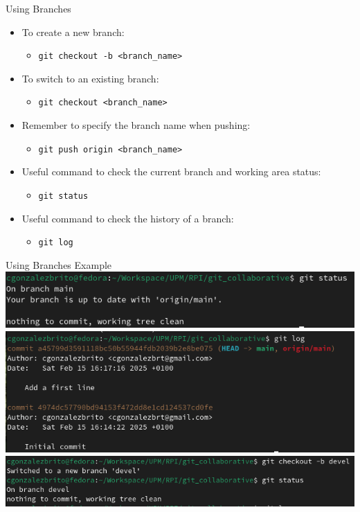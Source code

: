 \begin{frame}{Using Branches}
  \begin{itemize}
    \item To create a new branch:
      \begin{itemize}
        \item \texttt{git checkout -b <branch\_name>}
      \end{itemize}
    \item To switch to an existing branch:
      \begin{itemize}
        \item \texttt{git checkout <branch\_name>}
      \end{itemize}
    \item Remember to specify the branch name when pushing:
      \begin{itemize}
        \item \texttt{git push origin <branch\_name>}
      \end{itemize}
    \item Useful command to check the current branch and working area status:
      \begin{itemize}
        \item \texttt{git status}
      \end{itemize}
    \item Useful command to check the history of a branch:
      \begin{itemize}
        \item \texttt{git log}
      \end{itemize}
  \end{itemize}
\end{frame}

\begin{frame}{Using Branches Example}
  \centering
  \includegraphics[width=0.75\linewidth]{trainingmaterials/git-II/git_status_main.png}
  \includegraphics[width=0.75\linewidth]{trainingmaterials/git-II/git_log_main.png}
  \includegraphics[width=0.75\linewidth]{trainingmaterials/git-II/git_new_branch_devel.png}
\end{frame}


